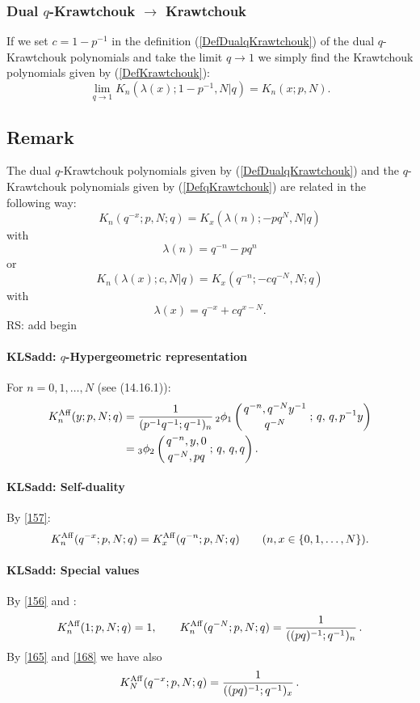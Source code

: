 \documentclass[envcountchap,graybox]{svmono}
\newcommand{\qhyp}[5]{\mbox{}_{#1}{\phi}_{#2}
\left(\genfrac{}{}{0pt}{}{#3}{#4}\,;\,q,\,#5\right)}
\newcommand{\qhyp}[5]{\,\mbox{}_{#1}\phi_{#2}\!\left(
  \genfrac{}{}{0pt}{}{#3}{#4};#5\right)}
\begin{document}
{\subsubsection*{Dual $q$-Krawtchouk $\rightarrow$ Krawtchouk}
If we set $c=1-p^{-1}$ in the definition (\ref{DefDualqKrawtchouk}) of the
dual $q$-Krawtchouk polynomials and take the limit $q\rightarrow 1$ we simply find
the Krawtchouk polynomials given by (\ref{DefKrawtchouk}):
\begin{equation}
\lim_{q\rightarrow 1}K_n(\lambda(x);1-p^{-1},N|q)=K_n(x;p,N).
\end{equation}

\subsection*{Remark}
The dual $q$-Krawtchouk polynomials given by (\ref{DefDualqKrawtchouk})
and the $q$-Krawtchouk polynomials given by (\ref{DefqKrawtchouk}) are
related in the following way:
$$K_n(q^{-x};p,N;q)=K_x(\lambda(n);-pq^N,N|q)$$
with
$$\lambda(n)=q^{-n}-pq^n$$
or
$$K_n(\lambda(x);c,N|q)=K_x(q^{-n};-cq^{-N},N;q)$$
with
$$\lambda(x)=q^{-x}+cq^{x-N}.$$
 RS: add begin\label{sec14.16}
%
\paragraph{\large\bf KLSadd: $q$-Hypergeometric representation}For $n=0,1,\ldots,N$
(see (14.16.1)):
\begin{align}
K_n^{\rm Aff}(y;p,N;q)
&=\frac1{(p^{-1}q^{-1};q^{-1})_n}\,\qhyp21{q^{-n},q^{-N}y^{-1}}{q^{-N}}{q,p^{-1}y}
\label{156}\\
&=\qhyp32{q^{-n},y,0}{q^{-N},pq}{q,q}.
\label{157}
\end{align}
%
\paragraph{\large\bf KLSadd: Self-duality}By \eqref{157}:
\begin{equation}
K_n^{\rm Aff}(q^{-x};p,N;q)=K_x^{\rm Aff}(q^{-n};p,N;q)\qquad
(n,x\in\{0,1,\ldots,N\}).
\label{168}
\end{equation}
%
\paragraph{\large\bf KLSadd: Special values}By \eqref{156} and :
\begin{equation}
K_n^{\rm Aff}(1;p,N;q)=1,\qquad
K_n^{\rm Aff}(q^{-N};p,N;q)=\frac1{((pq)^{-1};q^{-1})_n}\,.
\label{165}
\end{equation}
By \eqref{165} and \eqref{168} we have also
\begin{equation}
K_N^{\rm Aff}(q^{-x};p,N;q)=\frac1{((pq)^{-1};q^{-1})_x}\,.
\label{170}
\end{equation}
%
}
\end{document}
